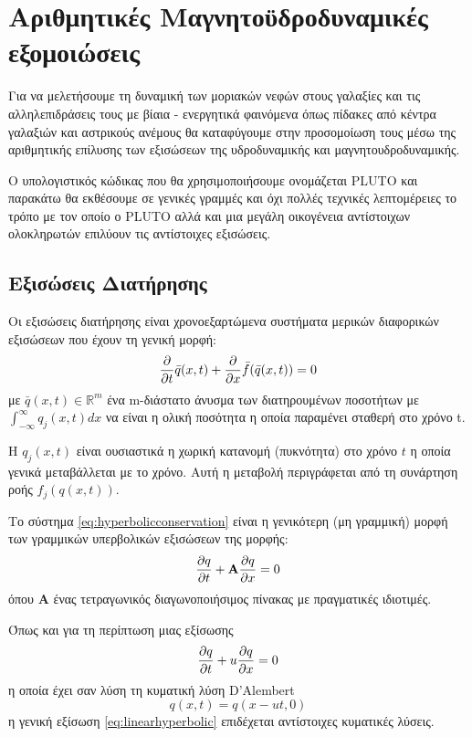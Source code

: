 \newpage

\section{Αριθμητικές Μαγνητοϋδροδυναμικές εξομοιώσεις}
Για να μελετήσουμε τη δυναμική των μοριακών νεφών στους γαλαξίες και τις αλληλεπιδράσεις τους με βίαια - ενεργητικά φαινόμενα όπως πίδακες από κέντρα γαλαξιών και αστρικούς ανέμους θα καταφύγουμε στην προσομοίωση τους μέσω της αριθμητικής επίλυσης των εξισώσεων της υδροδυναμικής και μαγνητουδροδυναμικής.

Ο υπολογιστικός κώδικας που θα χρησιμοποιήσουμε ονομάζεται PLUTO \cite{mignone_pluto:_2007} και παρακάτω θα εκθέσουμε σε γενικές γραμμές και όχι πολλές τεχνικές λεπτομέρειες το τρόπο με τον οποίο ο PLUTO αλλά και μια μεγάλη οικογένεια αντίστοιχων ολοκληρωτών επιλύουν τις αντίστοιχες εξισώσεις.

\subsection{Εξισώσεις Διατήρησης}
Οι εξισώσεις διατήρησης είναι χρονοεξαρτώμενα συστήματα μερικών διαφορικών εξισώσεων που έχουν τη γενική μορφή:
\begin{equation}
\label{eq:hyperbolicconservation}
\pdv{t} \bar{q}(x,t) + \pdv{x} \bar{f}(\bar{q}(x,t)) = 0 
\end{equation}
με $\bar{q}(x,t) \in \mathbb{R}^m$ ένα m-διάστατο άνυσμα των διατηρουμένων ποσοτήτων με  $\int_{-\infty}^{\infty} q_j (x,t) dx$ να είναι η ολική ποσότητα η οποία παραμένει σταθερή στο χρόνο t. 

Η $q_j(x,t)$ είναι ουσιαστικά η χωρική κατανομή (πυκνότητα) στο χρόνο $t$ η οποία γενικά μεταβάλλεται με το χρόνο.
Αυτή η μεταβολή περιγράφεται από τη συνάρτηση ροής $f_j(q(x,t))$. 
 
Το σύστημα \ref{eq:hyperbolicconservation} είναι η γενικότερη (μη γραμμική) μορφή των γραμμικών υπερβολικών εξισώσεων της μορφής:
\begin{equation}
\label{eq:linearhyperbolic}
\pdv{q}{t} +  \mathbf{A}\pdv{q}{x}  = 0 
\end{equation}
όπου $\mathbf{A}$ ένας τετραγωνικός διαγωνοποιήσιμος πίνακας με πραγματικές ιδιοτιμές.

Όπως και για τη περίπτωση μιας εξίσωσης
\begin{equation}
\label{eq:simple_advection}
\pdv{q}{t} +  u\pdv{q}{x}  = 0 
\end{equation}
η οποία έχει σαν λύση τη κυματική λύση D'Alembert
\begin{equation}
q(x,t)=q(x-ut,0)
\end{equation}
η γενική εξίσωση \ref{eq:linearhyperbolic} επιδέχεται αντίστοιχες κυματικές λύσεις.

